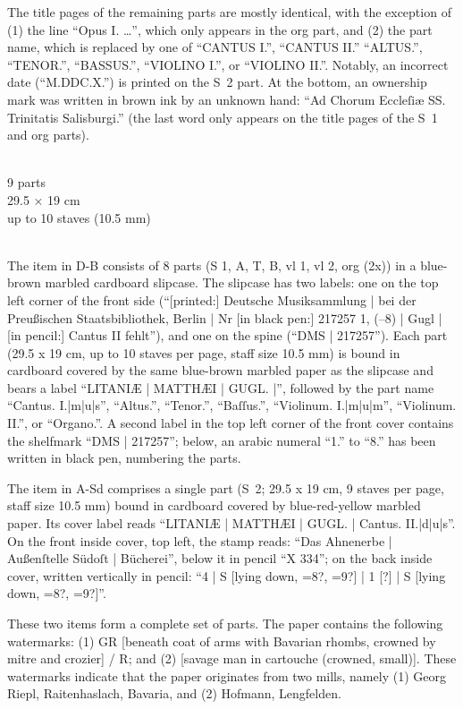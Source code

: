 \documentclass[abbrwidth=7em,shorttitlesize=55]{ees}
\begin{document}
\vspace*{-\baselineskip}
The title pages of the remaining parts are mostly identical, with the exception of (1) the line “Opus I. …”, which only appears in the org part, and (2) the part name, which is replaced by one of “CANTUS I.”, “CANTUS II.” “ALTUS.”, “TENOR.”, “BASSUS.”, “VIOLINO I.”, or “VIOLINO II.”. Notably, an incorrect date (“M.DDC.X.”) is printed on the S~2 part. At the bottom, an ownership mark was written in brown ink by an unknown hand: “Ad Chorum Eccleſiæ SS. Trinitatis Salisburgi.” (the last word only appears on the title pages of the S~1 and org parts).


\\
9 parts\\
29.5 × 19 cm\\
up to 10 staves (10.5 mm)

\\
The item in D-B consists of 8 parts (S 1, A, T, B, vl 1, vl 2, org (2x)) in a blue-brown marbled cardboard slipcase. The slipcase has two labels: one on the top left corner of the front side (“[printed:] Deutsche Musiksammlung | bei der Preußischen Staatsbibliothek, Berlin | Nr [in black pen:] 217257 1, (–8) | Gugl | [in pencil:] Cantus II fehlt”), and one on the spine (“DMS | 217257”). Each part (29.5 x 19 cm, up to 10 staves per page, staff size 10.5 mm) is bound in cardboard covered by the same blue-brown marbled paper as the slipcase and bears a label “LITANIÆ | MATTHÆI | GUGL. |”, followed by the part name “Cantus. I.|m|u|s”, “Altus.”, “Tenor.”, “Baſſus.”, “Violinum. I.|m|u|m”, “Violinum. II.”, or “Organo.”. A second label in the top left corner of the front cover contains the shelfmark “DMS | 217257”; below, an arabic numeral “1.” to “8.” has been written in black pen, numbering the parts.

The item in A-Sd comprises a single part (S~2; 29.5 x 19 cm, 9 staves per page, staff size 10.5 mm) bound in cardboard covered by blue-red-yellow marbled paper. Its cover label reads “LITANIÆ | MATTHÆI | GUGL. | Cantus. II.|d|u|s”. On the front inside cover, top left, the stamp reads: “Das Ahnenerbe | Außenſtelle Südoſt | Bücherei”, below it in pencil “X 334”; on the back inside cover, written vertically in pencil: “4 | S [lying down, =8?, =9?] | 1 [?] | S [lying down, =8?, =9?]”.

These two items form a complete set of parts. The paper contains the following watermarks: (1) GR [beneath coat of arms with Bavarian rhombs, crowned by mitre and crozier] / R; and (2) [savage man in cartouche (crowned, small)]. These watermarks indicate that the paper originates from two mills, namely (1) Georg Riepl, Raitenhaslach, Bavaria, and (2) Hofmann, Lengfelden.
\end{document}
